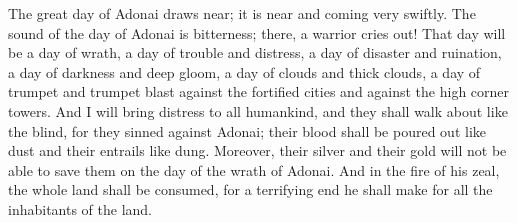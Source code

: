 \begin{biblechapter}
\verse The great day of Adonai draws near; 
it is near and coming very swiftly. 
The sound of the day of Adonai is bitterness; 
there, a warrior cries out!
\verse That day will be a day of wrath, 
a day of trouble and distress, 
a day of disaster and ruination, 
a day of darkness and deep gloom, 
a day of clouds and thick clouds,
\verse a day of trumpet and trumpet blast 
against the fortified cities 
and against the high corner towers.
\verse And I will bring distress to all humankind, 
and they shall walk about like the blind, 
for they sinned against Adonai; 
their blood shall be poured out like dust 
and their entrails like dung.
\verse Moreover, their silver and their gold 
will not be able to save them 
on the day of the wrath of Adonai. 
And in the fire of his zeal, 
the whole land shall be consumed, 
for a terrifying end he shall make 
for all the inhabitants of the land.
\end{biblechapter}

